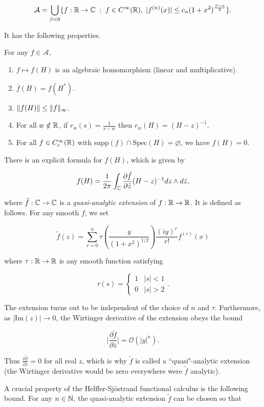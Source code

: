 \documentclass[12pt, letterpaper]{article}
\begin{document}
\[\mathcal{A} = \bigcup_{\beta<0} \{f:\mathbb{R}\to\mathbb{C} \; : \; f \in C^\infty(\mathbb{R}), \; |f^{(n)}(x)| \leq c_n (1+x^2)^{\frac{\beta-n}{2}}\}.\]

It has the following properties.

\begin{theorem}
For any $f\in \mathcal{A}$,
\begin{enumerate}
\item $f\mapsto f(H)$ is an algebraic homomorphism (linear and multiplicative).
\item $\overline{f}(H) = f(H^*)$.
\item $\lVert f(H) \rVert \leq \lVert f \rVert_\infty$.
\item For all $w \notin \mathbb{R}$, if $r_w(s) = \frac{1}{s-w}$ then $r_w(H) = (H-z)^{-1}$.
\item For all $f \in C^\infty_c(\mathbb{R})$ with $\text{supp}(f) \cap \text{Spec}(H) = \varnothing$, we have $f(H)=0$.
\end{enumerate}
\end{theorem}

There is an explicit formula for $f(H)$, which is given by

\[ f(H) = \frac{1}{2\pi}\int_{\mathbb{C}} \frac{\partial \tilde{f}}{\partial \bar{z}} (H-z)^{-1}dz\wedge d\bar{z},\]

where $\tilde{f}:\mathbb{C}\to\mathbb{C}$ is a \emph{quasi-analytic extension} of $f:\mathbb{R}\to\mathbb{R}$. It is defined as follows. For any smooth $f$, we set

\[\tilde{f}(z) = \sum_{r=0}^n \tau\left(\frac{y}{(1+x^2)^{1/2}}\right)  \frac{(iy)^r}{r!} f^{(r)}(x)\]

where $\tau:\mathbb{R}\to\mathbb{R}$ is any smooth function satisfying 

\[\tau(s) = \begin{cases}1 & |s|<1 \\ 0 & |s|>2\end{cases}.\]

The extension turns out to be independent of the choice of $n$ and $\tau$. Furthermore, as $|\text{Im}(z)| \to 0$, the Wirtinger derivative of the extension obeys the bound 

\[\bigg|\frac{\partial \tilde{f}}{\partial \bar{z}} \bigg| = \mathcal{O}(|y|^n).\]

Thus $\frac{\partial \tilde{f}}{\partial \bar{z}} = 0$ for all real $z$, which is why $\tilde{f}$ is called a ``quasi"-analytic extension (the Wirtinger derivative would be zero everywhere were $\tilde{f}$ analytic).

A crucial property of the Helffer-Sj\"{o}strand functional calculus is the following bound. For any $n\in \mathbb{N}$, the quasi-analytic extension $\tilde{f}$ can be chosen so that 
\end{document}

